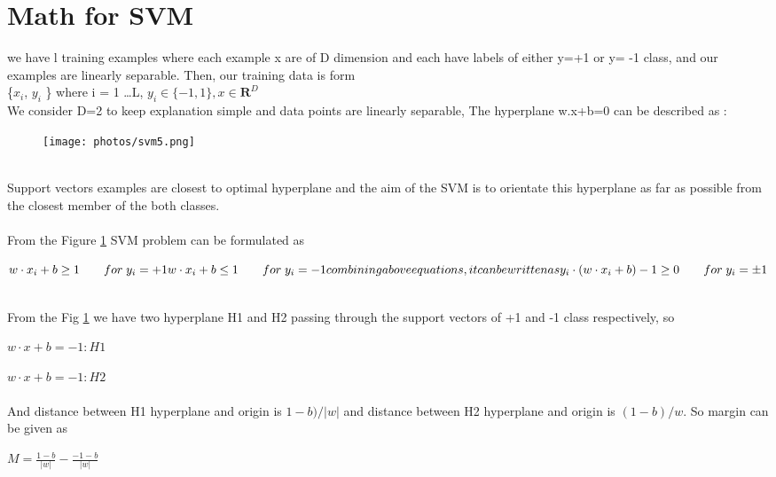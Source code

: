 \documentclass[10pt,a4paper]{report}
\begin{document}
\section{Math for SVM}
we have l training examples where each example x are of D dimension and each have labels of either y=+1 or y= -1 class, and our examples are linearly separable. Then, our training data is form \\
\{$ x_i$, $ y_i $ \} where  i = 1 \dots L, $ y_i \in \{-1,1\}, x \in \mathbf{R}^D $ \\
We consider D=2 to keep explanation simple and data points are linearly separable, The hyperplane w.x+b=0 can be described as : \\
\begin{figure}[h]
\texttt{[image: photos/svm5.png]}
\caption{}
\label{fig:figure2}
\end{figure} \\
Support vectors examples are closest to optimal hyperplane and the aim of the SVM is to orientate this hyperplane as far as possible from the closest member of the both classes.\cite{chen2001one} \\
\\
From the Figure \ref{fig:figure2} SVM problem can be formulated as \\
\begin{center}
\begin{math}
w \cdot x_i + b \geq 1 \qquad for \; y_i = +1 \\
w \cdot x_i + b \leq 1 \qquad for \; y_i = -1 \\
combining above equations, it can be written as \\
y_i \cdot (w \cdot x_i + b) -1 \geq 0 \qquad for \; y_i = \pm 1 \\
\end{math}
\end{center}
\\
From the Fig \ref{fig:figure2} we have two hyperplane H1 and H2 passing through the support vectors of +1 and -1 class respectively, so 

$ w \cdot x + b = -1 : H1$

$ w \cdot x + b = -1 : H2$ \\
\\
And distance between H1 hyperplane and origin is $ 1-b)/|w|$ and distance between H2 hyperplane and origin is $ (1-b)/ w $. So margin can be given as

$ M = \frac{1-b}{|w|} - \frac{-1-b}{|w|}$
\end{document}
